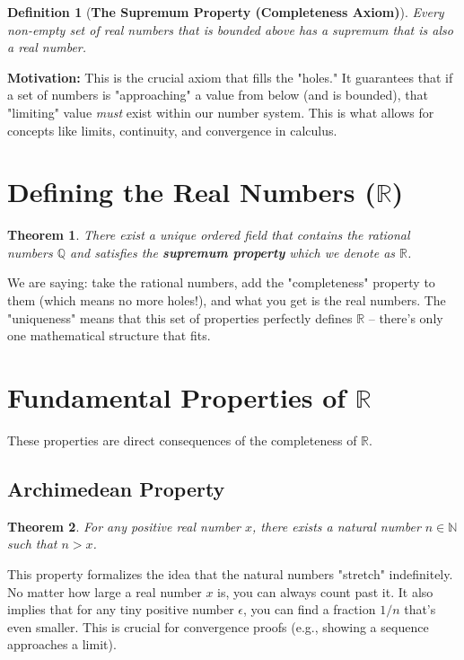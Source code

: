\documentclass[12pt]{article}
\newtheorem{definition}{Definition}[section] %
\newtheorem{theorem}{Theorem}[section]     %
\begin{document}
\begin{definition}[\textbf{The Supremum Property (Completeness Axiom)}]
Every non-empty set of real numbers that is bounded above has a supremum \textit{that is also a real number}.
\end{definition}

\textbf{Motivation:} This is the crucial axiom that fills the "holes." It guarantees that if a set of numbers is "approaching" a value from below (and is bounded), that "limiting" value \textit{must} exist within our number system. This is what allows for concepts like limits, continuity, and convergence in calculus.

\section{Defining the Real Numbers ($\mathbb{R}$)}

\begin{theorem}
    There exist a unique ordered field that contains the rational numbers $\mathbb{Q}$ and satisfies the \textbf{supremum property} which we denote as $\mathbb{R}$.
\end{theorem}

We are saying: take the rational numbers, add the "completeness" property to them (which means no more holes!), and what you get is the real numbers. The "uniqueness" means that this set of properties perfectly defines $\mathbb{R}$ -- there's only one mathematical structure that fits.

\section{Fundamental Properties of $\mathbb{R}$}

These properties are direct consequences of the completeness of $\mathbb{R}$.

\subsection{Archimedean Property}

\begin{theorem}
For any positive real number $x$, there exists a natural number $n \in \mathbb{N}$ such that $n > x$.
\end{theorem}
This property formalizes the idea that the natural numbers "stretch" indefinitely. No matter how large a real number $x$ is, you can always count past it. It also implies that for any tiny positive number $\epsilon$, you can find a fraction $1/n$ that's even smaller. This is crucial for convergence proofs (e.g., showing a sequence approaches a limit).
\end{document}
